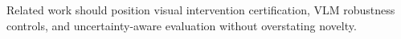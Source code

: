 Related work should position visual intervention certification, VLM robustness controls, and uncertainty-aware evaluation without overstating novelty.
